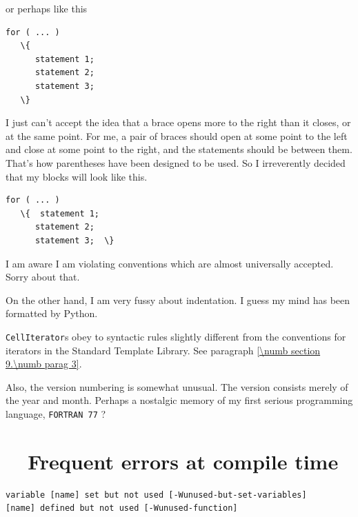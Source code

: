 or perhaps like this

\begin{Verbatim}[commandchars=\\\{\},formatcom=\small\tt,baselinestretch=0.94]
   for ( ... )
   \{
      statement 1;
      statement 2;
      statement 3;
   \}
\end{Verbatim}

I just can't accept the idea that a brace opens more to the right than it closes, or at the
same point.
For me, a pair of braces should open at some point to the left and close at some point to the
right, and the statements should be between them.
That's how parentheses have been designed to be used.
So I irreverently decided that my blocks will look like this.

\begin{Verbatim}[commandchars=\\\{\},formatcom=\small\tt,baselinestretch=0.94]
   for ( ... )
   \{  statement 1;
      statement 2;
      statement 3;  \}
\end{Verbatim}

I am aware I am violating conventions which are almost universally accepted. Sorry about that.

On the other hand, I am very fussy about indentation.
I guess my mind has been formatted by Python.

{\small\tt CellIterator}s obey to syntactic rules slightly different from the conventions for
iterators in the Standard Template Library.
See paragraph \ref{\numb section 9.\numb parag 3}.

Also, the version numbering is somewhat unusual.
The version consists merely of the year and month.
Perhaps a nostalgic memory of my first serious programming language, {\tt FORTRAN 77} ?


\section{~~Frequent errors at compile time}\label{\numb section 11.\numb parag 13}

\begin{Verbatim}[commandchars=\\\{\},formatcom=\small\tt,baselinestretch=0.94]
variable [name] set but not used [-Wunused-but-set-variables]
[name] defined but not used [-Wunused-function]
\end{Verbatim}

